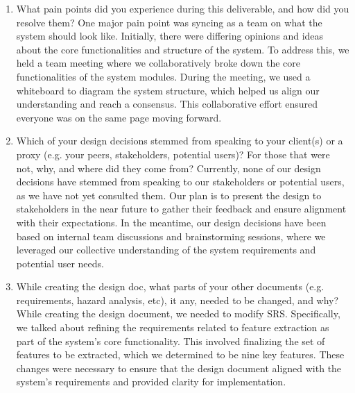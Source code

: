 \documentclass[12pt, titlepage]{article}
\begin{document}
\begin{enumerate}
  \item What pain points did you experience during this deliverable, and how
    did you resolve them?
    One major pain point was syncing as a team on what the system should look like. Initially, there were differing opinions and ideas about the core functionalities and structure of the system. To address this, we held a team meeting where we collaboratively broke down the core functionalities of the system modules. During the meeting, we used a whiteboard to diagram the system structure, which helped us align our understanding and reach a consensus. This collaborative effort ensured everyone was on the same page moving forward.
  \item Which of your design decisions stemmed from speaking to your client(s)
  or a proxy (e.g. your peers, stakeholders, potential users)? For those that
  were not, why, and where did they come from?
  Currently, none of our design decisions have stemmed from speaking to our stakeholders or potential users, as we have not yet consulted them. Our plan is to present the design to stakeholders in the near future to gather their feedback and ensure alignment with their expectations. In the meantime, our design decisions have been based on internal team discussions and brainstorming sessions, where we leveraged our collective understanding of the system requirements and potential user needs.
  \item While creating the design doc, what parts of your other documents (e.g.
  requirements, hazard analysis, etc), it any, needed to be changed, and why?
  While creating the design document, we needed to modify SRS. Specifically, we talked about refining the requirements related to feature extraction as part of the system’s core functionality. This involved finalizing the set of features to be extracted, which we determined to be nine key features. These changes were necessary to ensure that the design document aligned with the system’s requirements and provided clarity for implementation.


\end{enumerate}
\end{document}
